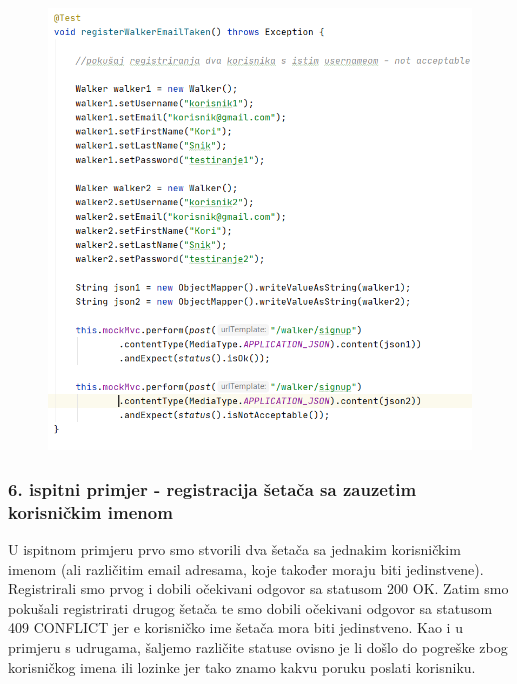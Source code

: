 			
			\begin{figure}[H]
				\centerline{
					\includegraphics[scale=0.75]{slike/walker1.PNG}}
				\centering
			\end{figure}
			
			\newpage
				
			\subsubsection{6. ispitni primjer - registracija šetača sa zauzetim korisničkim imenom}
			
			U ispitnom primjeru prvo smo stvorili dva šetača sa jednakim korisničkim imenom (ali različitim email adresama, koje također moraju biti jedinstvene). Registrirali smo prvog i dobili očekivani odgovor sa statusom 200 OK. Zatim smo pokušali registrirati drugog šetača te smo dobili  očekivani odgovor sa statusom 409 CONFLICT jer e korisničko ime šetača mora biti jedinstveno. Kao i u primjeru s udrugama, šaljemo različite statuse ovisno je li došlo do pogreške zbog korisničkog imena ili lozinke jer tako znamo kakvu poruku poslati korisniku.
			
